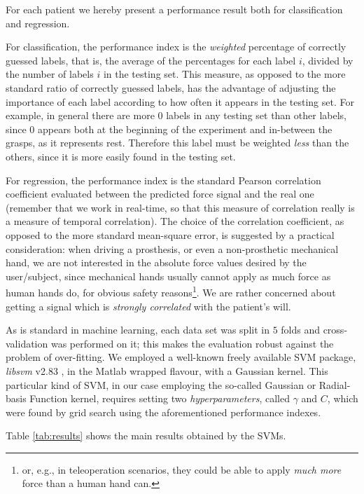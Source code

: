 For each patient we hereby present a performance result both for
classification and regression.

For classification, the performance index is the \emph{weighted}
percentage of correctly guessed labels, that is, the average of the
percentages for each label $i$, divided by the number of labels $i$ in
the testing set. This measure, as opposed to the more standard ratio
of correctly guessed labels, has the advantage of adjusting the
importance of each label according to how often it appears in the
testing set. For example, in general there are more $0$ labels in any
testing set than other labels, since $0$ appears both at the beginning
of the experiment and in-between the grasps, as it represents
rest. Therefore this label must be weighted \emph{less} than the
others, since it is more easily found in the testing set.

For regression, the performance index is the standard Pearson
correlation coefficient evaluated between the predicted force signal
and the real one (remember that we work in real-time, so that this
measure of correlation really is a measure of temporal
correlation). The choice of the correlation coefficient, as opposed to
the more standard mean-square error, is suggested by a practical
consideration: when driving a prosthesis, or even a non-prosthetic
mechanical hand, we are not interested in the absolute force values
desired by the user/subject, since mechanical hands usually cannot
apply as much force as human hands do, for obvious safety
reasons\footnote{or, e.g., in teleoperation scenarios, they could be
able to apply \emph{much more} force than a human hand can.}. We are
rather concerned about getting a signal which is \emph{strongly
correlated} with the patient's will.

As is standard in machine learning, each data set was split in $5$
folds and cross-validation was performed on it; this makes the
evaluation robust against the problem of over-fitting. We employed a
well-known freely available SVM package, \emph{libsvm} v2.83
\cite{ChangL01}, in the Matlab wrapped flavour, with a Gaussian
kernel. This particular kind of SVM, in our case employing the
so-called Gaussian or Radial-basis Function kernel, requires setting
two \emph{hyperparameters}, called $\gamma$ and $C$, which were found
by grid search using the aforementioned performance indexes.

Table \ref{tab:results} shows the main results obtained by the SVMs.

